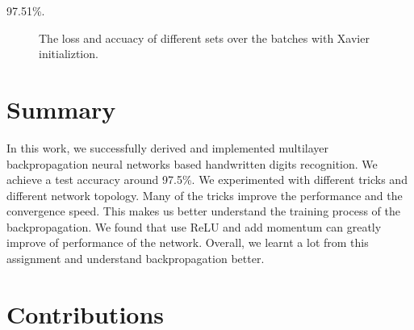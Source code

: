 \documentclass{article} %
\begin{document}
97.51\%.
\begin{figure} [!htbp]
	
	\caption{The loss and accuacy of different sets over the batches with Xavier initializtion. }  
	
\end{figure}


\section{Summary}
In this work, we successfully derived and implemented multilayer backpropagation neural networks based handwritten digits recognition. We achieve a test accuracy around 97.5\%. We experimented with different tricks and different network topology. Many of the tricks improve the performance and the convergence speed. This makes us better understand the training process of the backpropagation. We found that use ReLU and add momentum can greatly improve of performance of the network. Overall, we learnt a lot from this assignment and understand backpropagation better.

\section{Contributions}
\end{document}
